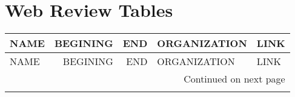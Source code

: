 \chapter{\label{ax:e-web_review_tables}Web Review Tables}

\begin{table}[!h]

\begin{longtable}{lrrll}
\toprule
                                              NAME &  BEGINING &  END &                                       ORGANIZATION &                                               LINK \\
\midrule
\endfirsthead

\toprule
                                              NAME &  BEGINING &  END &                                       ORGANIZATION &                                               LINK \\
\midrule
\endhead
\midrule
\multicolumn{5}{r}{{Continued on next page}} \\
\midrule
\endfoot


\end{longtable}
\end{table}
